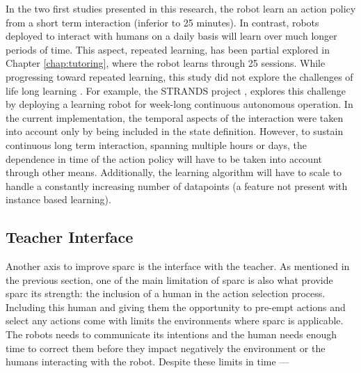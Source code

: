 In the two first studies presented in this research, the robot learn an action policy from a short term interaction (inferior to 25 minutes). In contrast, robots deployed to interact with humans on a daily basis will learn over much longer periods of time. This aspect, repeated learning, has been partial explored in Chapter \ref{chap:tutoring}, where the robot learns through 25 sessions. While progressing toward repeated learning, this study did not explore the challenges of life long learning \citep{thrun1995lifelong}. For example, the STRANDS project \cite{hawes2017strands}, explores this challenge by deploying a learning robot for week-long continuous autonomous operation. In the current implementation, the temporal aspects of the interaction were taken into account only by being included in the state definition. However, to sustain continuous long term interaction, spanning multiple hours or days, the dependence in time of the action policy will have to be taken into account through other means. Additionally, the learning algorithm will have to scale to handle a constantly increasing number of datapoints (a feature not present with instance based learning).


\subsection{Teacher Interface}

Another axis to improve \gls{sparc} is the interface with the teacher. As mentioned in the previous section, one of the main limitation of \gls{sparc} is also what provide \gls{sparc} its strength: the inclusion of a human in the action selection process. Including this human and giving them the opportunity to pre-empt actions and select any actions come with limits the environments where \gls{sparc} is applicable. The robots needs to communicate its intentions and the human needs enough time to correct them before they impact negatively the environment or the humans interacting with the robot. Despite these limits in time ---

